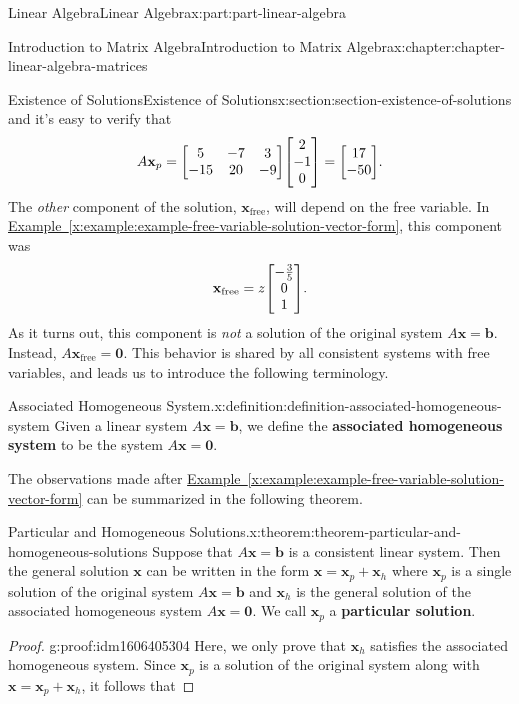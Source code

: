 \documentclass[twoside,10pt,]{book}
\newcommand{\xreffont}{\relax}
\newcommand{\terminology}[1]{\textbf{#1}}
\numberwithin{equation}{part}
\providecommand{\vb}[1]{\mathbf{#1}}
\begin{document}
\begin{partptx}{Linear Algebra}{}{Linear Algebra}{}{}{x:part:part-linear-algebra}
\begin{chapterptx}{Introduction to Matrix Algebra}{}{Introduction to Matrix Algebra}{}{}{x:chapter:chapter-linear-algebra-matrices}
\begin{sectionptx}{Existence of Solutions}{}{Existence of Solutions}{}{}{x:section:section-existence-of-solutions}
and it's easy to verify that%
\begin{equation*}
A\vb{x}_{p} = \mqty[5 & -7 & 3 \\ -15 & 20 & -9]\mqty[2\\-1\\0] = \mqty[17\\-50].
\end{equation*}
The \emph{other} component of the solution, \(\vb{x}_{\text{free}}\), will depend on the free variable. In \hyperref[x:example:example-free-variable-solution-vector-form]{Example~{\xreffont\ref{x:example:example-free-variable-solution-vector-form}}}, this component was%
\begin{equation*}
\vb{x}_{\text{free}} = z\mqty[-\frac{3}{5} \\ 0 \\ 1].
\end{equation*}
As it turns out, this component is \emph{not} a solution of the original system \(A\vb{x} = \vb{b}\). Instead, \(A\vb{x}_{\text{free}} = \vb{0}\). This behavior is shared by all consistent systems with free variables, and leads us to introduce the following terminology.%
\begin{definition}{Associated Homogeneous System.}{x:definition:definition-associated-homogeneous-system}%
%
Given a linear system \(A\vb{x} = \vb{b}\), we define the \terminology{associated homogeneous system} to be the system \(A\vb{x} = \vb{0}\).%
\end{definition}
The observations made after \hyperref[x:example:example-free-variable-solution-vector-form]{Example~{\xreffont\ref{x:example:example-free-variable-solution-vector-form}}} can be summarized in the following theorem.%
\begin{theorem}{Particular and Homogeneous Solutions.}{}{x:theorem:theorem-particular-and-homogeneous-solutions}%
Suppose that \(A\vb{x} = \vb{b}\) is a consistent linear system. Then the general solution \(\vb{x}\) can be written in the form \(\vb{x} = \vb{x}_{p} + \vb{x}_{h}\) where \(\vb{x}_{p}\) is a single solution of the original system \(A\vb{x} = \vb{b}\) and \(\vb{x}_{h}\) is the general solution of the associated homogeneous system \(A\vb{x} = \vb{0}\). We call \(\vb{x}_{p}\) a \terminology{particular solution}.%
\end{theorem}
\begin{proof}{}{g:proof:idm1606405304}
Here, we only prove that \(\vb{x}_{h}\) satisfies the associated homogeneous system. Since \(\vb{x}_{p}\) is a solution of the original system along with \(\vb{x} = \vb{x}_{p} + \vb{x}_{h}\), it follows that%

\end{proof}
\end{sectionptx}
\end{chapterptx}
\end{partptx}
\end{document}
